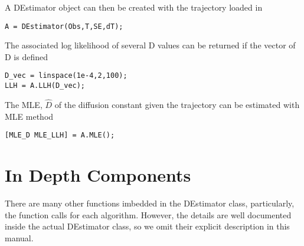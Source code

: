 \documentclass{article}
\begin{document}
A DEstimator object can then be created with the trajectory loaded in
\begin{verbatim}
A = DEstimator(Obs,T,SE,dT);
\end{verbatim}

The associated log likelihood of several D values can be returned if the vector of D is defined
\begin{verbatim}
D_vec = linspace(1e-4,2,100);
LLH = A.LLH(D_vec);
\end{verbatim}

The MLE, $\hat{D}$ of the diffusion constant given the trajectory can be estimated with MLE method
\begin{verbatim}
[MLE_D MLE_LLH] = A.MLE();
\end{verbatim}

\section{In Depth Components}
There are many other functions imbedded in the DEstimator class, particularly, the function calls for each algorithm.  However, the details are well documented inside the actual DEstimator class, so we omit their explicit description in this manual.
\end{document}
